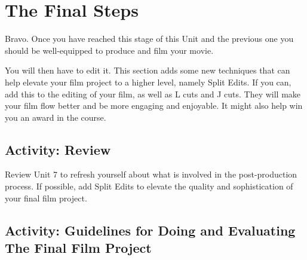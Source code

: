 \documentclass[
]{book}
\begin{document}
\hypertarget{the-final-steps}{%
\section{The Final Steps}\label{the-final-steps}}

Bravo. Once you have reached this stage of this Unit and the previous one you should be well-equipped to produce and film your movie.

You will then have to edit it. This section adds some new techniques that can help elevate your film project to a higher level, namely Split Edits. If you can, add this to the editing of your film, as well as L cuts and J cuts. They will make your film flow better and be more engaging and enjoyable. It might also help win you an award in the course.

\hypertarget{activity-review}{%
\subsection*{Activity: Review}\label{activity-review}}

\begin{reflect}
Review Unit 7 to refresh yourself about what is involved in the post-production process. If possible, add Split Edits to elevate the quality and sophistication of your final film project.
\end{reflect}

\hypertarget{activity-guidelines-for-doing-and-evaluating-the-final-film-project}{%
\subsection*{Activity: Guidelines for Doing and Evaluating The Final Film Project}\label{activity-guidelines-for-doing-and-evaluating-the-final-film-project}}
\end{document}
